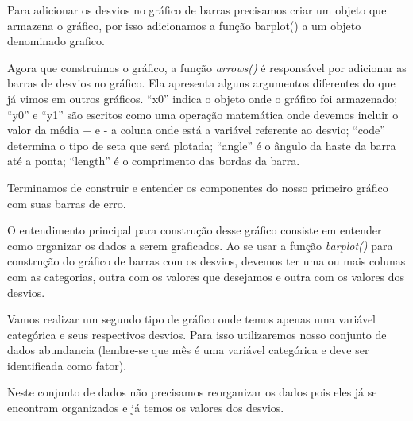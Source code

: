 \documentclass[]{book}
\newenvironment{Shaded}{\begin{snugshade}}{\end{snugshade}}
\newcommand{\DataTypeTok}[1]{\textcolor[rgb]{0.13,0.29,0.53}{#1}}
\newcommand{\DecValTok}[1]{\textcolor[rgb]{0.00,0.00,0.81}{#1}}
\newcommand{\KeywordTok}[1]{\textcolor[rgb]{0.13,0.29,0.53}{\textbf{#1}}}
\newcommand{\NormalTok}[1]{#1}
\newcommand{\OperatorTok}[1]{\textcolor[rgb]{0.81,0.36,0.00}{\textbf{#1}}}
\newcommand{\StringTok}[1]{\textcolor[rgb]{0.31,0.60,0.02}{#1}}
\begin{document}
Para adicionar os desvios no gráfico de barras precisamos criar um objeto que armazena o gráfico, por isso adicionamos a função barplot() a um objeto denominado grafico.

Agora que construimos o gráfico, a função \emph{arrows()} é responsável por adicionar as barras de desvios no gráfico. Ela apresenta alguns argumentos diferentes do que já vimos em outros gráficos. ``x0'' indica o objeto onde o gráfico foi armazenado; ``y0'' e ``y1'' são escritos como uma operação matemática onde devemos incluir o valor da média + e - a coluna onde está a variável referente ao desvio; ``code'' determina o tipo de seta que será plotada; ``angle'' é o ângulo da haste da barra até a ponta; ``length'' é o comprimento das bordas da barra.

Terminamos de construir e entender os componentes do nosso primeiro gráfico com suas barras de erro.

O entendimento principal para construção desse gráfico consiste em entender como organizar os dados a serem graficados. Ao se usar a função \emph{barplot()} para construção do gráfico de barras com os desvios, devemos ter uma ou mais colunas com as categorias, outra com os valores que desejamos e outra com os valores dos desvios.

Vamos realizar um segundo tipo de gráfico onde temos apenas uma variável categórica e seus respectivos desvios. Para isso utilizaremos nosso conjunto de dados abundancia (lembre-se que mês é uma variável categórica e deve ser identificada como fator).

Neste conjunto de dados não precisamos reorganizar os dados pois eles já se encontram organizados e já temos os valores dos desvios.

\begin{Shaded}
\end{Shaded}
\end{document}
